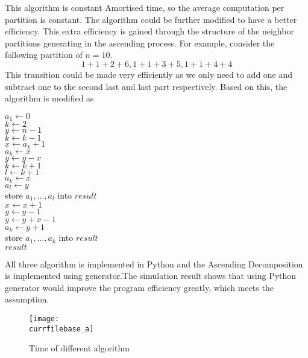 \documentclass[catalog.tex]{subfiles}
\begin{document}
This algorithm is constant Amortised time, so the average computation per partition is constant. The algorithm could be further modified to have a better efficiency\cite{3}. This extra efficiency is gained through the structure of the neighbor partitions generating in the ascending process. For example, consider the following partition of $n = 10$.
$$
1 + 1 +2+6 ,
1+1+3+5,
1+1+4+4
$$
This transition could be made very efficiently as we only need to add one and subtract one to the second last and last part respectively. Based on this, the algorithm is modified as 
\begin{Algorithm}[AscendingDecomp2]
	\BlankLine
	$a_1 \leftarrow 0$ \\
	$k \leftarrow 2$ \\
	$y \leftarrow n-1$ \\
	 {
	$k \leftarrow k - 1$ \\
	$x \leftarrow a_k + 1$ \\
	 {
		$a_k \leftarrow x$ \\
		$y \leftarrow y-x$ \\
		$k\leftarrow k+1$ \\
		}
	$l \leftarrow k + 1$ \\
	 {
		$a_k \leftarrow x$ \\
		$a_l \leftarrow y$ \\
		store $a_1, ...,a_l$ into $result$ \\
		$x \leftarrow x+1$ \\
		$y \leftarrow y-1$ \\
	}
		$y \leftarrow y+x-1$ \\
		$a_k \leftarrow y+1$ \\
		store $a_1, ..., a_k$ into $result$ \\
		}
	\Ret $result$

\end{Algorithm}
All three algorithm is implemented in Python and the Ascending Decomposition is implemented using generator.The simulation result shows that using Python generator would improve the program efficiency greatly, which meets the assumption.
\begin{figure}[!htb]
	\centering
\texttt{[image: \\currfilebase\_a]}
	\caption{Time of different algorithm}
\end{figure}
\end{document}
